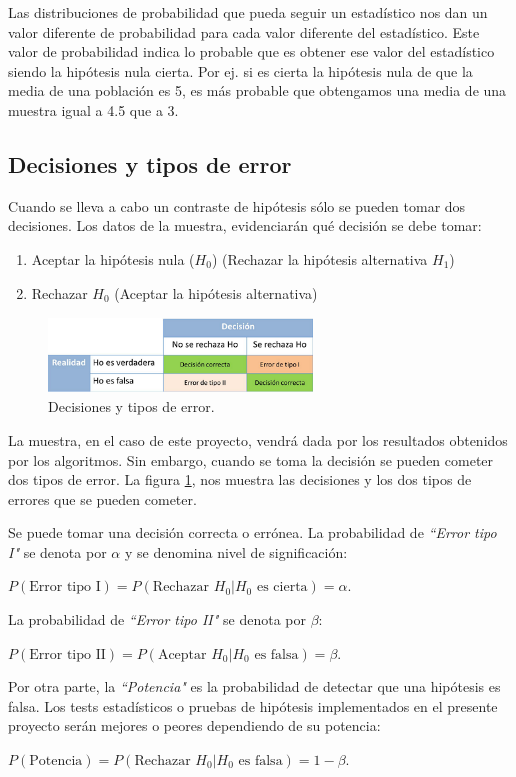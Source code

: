 Las distribuciones de probabilidad que pueda seguir un estadístico nos dan un valor diferente de probabilidad para
cada valor diferente del estadístico. Este valor de probabilidad indica lo probable que es obtener ese valor del
estadístico siendo la hipótesis nula cierta. Por ej. si es cierta la hipótesis nula de que la media de una población
es 5, es más probable que obtengamos una media de una muestra igual a 4.5 que a 3.


\subsection{Decisiones y tipos de error}
Cuando se lleva a cabo un contraste de hipótesis sólo se pueden tomar dos decisiones. Los datos de la muestra,
evidenciarán qué decisión se debe tomar:
\begin{enumerate}
\item Aceptar la hipótesis nula ($H_0$) (Rechazar la hipótesis alternativa $H_1$)
\item Rechazar $H_0$ (Aceptar la hipótesis alternativa)
\end{enumerate}
\begin{figure}[h]
\centering
\includegraphics[width=7cm,height=2cm]{figuras/figura1.png}
\caption{Decisiones y tipos de error.}
\label{fig:decision}
\end{figure}
La muestra, en el caso de este proyecto, vendrá dada por los resultados obtenidos por los algoritmos. Sin embargo,
cuando se toma la decisión se pueden cometer dos tipos de error. La figura \ref{fig:decision}, nos muestra las
decisiones y los dos tipos de errores que se pueden cometer.

Se puede tomar una decisión correcta o errónea. La probabilidad de \textit{``Error tipo I"} se denota por $\alpha$
y se denomina nivel de significación:
\begin{center}
$P(\mbox{Error tipo I}) = P(\mbox{Rechazar } H_0|H_0 \mbox{ es cierta}) =\alpha.$
\end{center}
La probabilidad de \textit{``Error tipo II"} se denota por $\beta$:
\begin{center}
$P(\mbox{Error tipo II}) = P(\mbox{Aceptar } H_0|H_0 \mbox{ es falsa}) =\beta.$
\end{center}
Por otra parte, la \textit{``Potencia"} es la probabilidad de detectar que una hipótesis es falsa. Los tests
estadísticos o pruebas de hipótesis implementados en el presente proyecto serán mejores o peores dependiendo
de su potencia:
\begin{center}
$P(\mbox{Potencia}) = P(\mbox{Rechazar } H_0|H_0 \mbox{ es falsa}) =1-\beta.$
\end{center}

